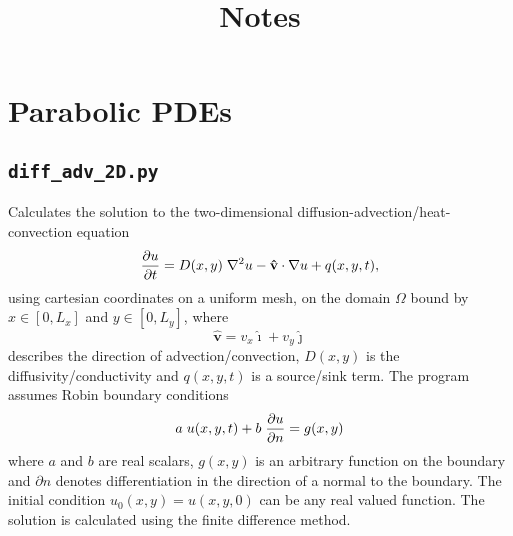 \documentclass{article}
\begin{document}
\title{Notes}

\section{Parabolic PDEs}

\subsection{\texttt{diff\_adv\_2D.py}} 

Calculates the solution to the two-dimensional diffusion-advection/heat-convection equation
\begin{equation*}
\frac{\partial u}{\partial t} = D(x,y) \hspace{0.1cm} \nabla^{2} u  - \mathbf{\hat{v}} \cdot \nabla u + q(x,y,t),
\end{equation*}
using cartesian coordinates on a uniform mesh, on the domain $\Omega$ bound by $x \in [0,L_x]$ and $y \in [0,L_y]$, where
\begin{equation*}
\mathbf{\hat{v}} = v_x \mathbf{\hat{\imath}} + v_y \mathbf{\hat{\jmath}}
\end{equation*}
describes the direction of advection/convection, $D(x,y)$ is the diffusivity/conductivity and $q(x,y,t)$ is a source/sink term. The program assumes Robin boundary conditions
\begin{equation*}
a \hspace{0.1cm} u(x,y,t) + b \hspace{0.1cm} \frac{\partial u}{\partial n} = g(x,y)
\end{equation*}
where $a$ and $b$ are real scalars, $g(x,y)$ is an arbitrary function on the boundary and $\partial n$ denotes differentiation in the direction of a normal to the boundary. The initial condition $u_0(x,y)=u(x,y,0)$ can be any real valued function. The solution is calculated using the finite difference method.
\end{document}
